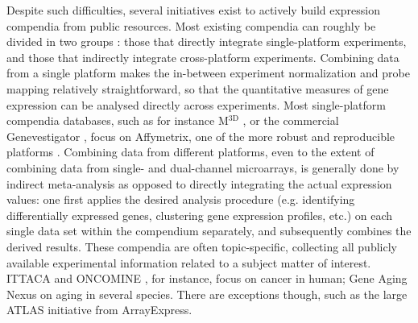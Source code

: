 Despite such difficulties, several initiatives exist to actively build expression compendia from public resources. Most existing compendia can roughly be divided in two groups \cite{Fierro2008}: those that directly integrate single-platform experiments, and those that indirectly integrate cross-platform experiments. Combining data from a single platform makes the in-between experiment normalization and probe mapping relatively straightforward, so that the quantitative measures of gene expression can be analysed directly across experiments. Most single-platform compendia databases, such as for instance M$^{\textrm{3D}}$ \cite{Faith2008}, or the commercial Genevestigator \cite{Hruz2008}, focus on Affymetrix, one of the more robust and reproducible platforms \cite{Bammler2005, Irizarry2005}. Combining data from different platforms, even to the extent of combining data from single- and dual-channel microarrays, is generally done by indirect meta-analysis as opposed to directly integrating the actual expression values: one first applies the desired analysis procedure (e.g. identifying differentially expressed genes, clustering gene expression profiles, etc.) on each single data set within the compendium separately, and subsequently combines the derived results. These compendia are often topic-specific, collecting all publicly available experimental information related to a subject matter of interest. ITTACA \cite{Elfilali2006} and ONCOMINE \cite{Rhodes2007}, for instance, focus on cancer in human; Gene Aging Nexus \cite{Pan2007} on aging in several species. There are exceptions though, such as the large ATLAS \cite{Kapushesky2010} initiative from ArrayExpress.

